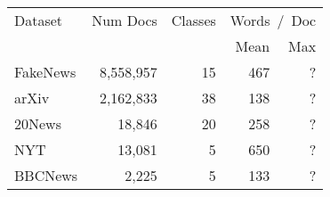 {
\small
\begin{tabular}{lrrrr}
\toprule
Dataset & Num Docs & Classes & \multicolumn{2}{c}{Words~/~Doc} \\
    \cmidrule{4-5}
& & & Mean&  Max\\
\midrule
FakeNews &8,558,957 &15 &467 &? \\
arXiv &2,162,833 &38 &138 &? \\
20News &18,846 &20 &258 &? \\
NYT &13,081 &5 &650 &? \\
BBCNews &2,225 &5 &133 &? \\
\bottomrule
\end{tabular}
}
